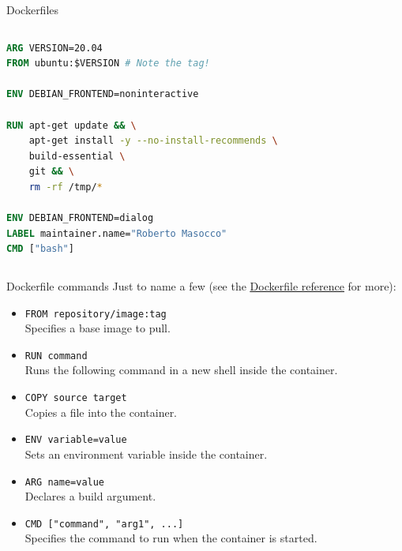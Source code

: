 \begin{frame}[fragile]{Dockerfiles}
\begin{columns}
\begin{lstlisting}[language=Dockerfile, caption=Minimal example of a Dockerfile running an Ubuntu image in a container]
ARG VERSION=20.04
FROM ubuntu:$VERSION # Note the tag!

ENV DEBIAN_FRONTEND=noninteractive

RUN apt-get update && \
    apt-get install -y --no-install-recommends \
    build-essential \
    git && \
    rm -rf /tmp/*

ENV DEBIAN_FRONTEND=dialog
LABEL maintainer.name="Roberto Masocco"
CMD ["bash"]
\end{lstlisting}
\end{columns}
\end{frame}
\begin{frame}{Dockerfile commands}
Just to name a few (see the \href{https://docs.docker.com/engine/reference/builder/}{\color{blue}\underline{Dockerfile reference}} for more):
\begin{itemize}
  \item \texttt{FROM repository/image:tag}\\Specifies a base image to pull.
  \item \texttt{RUN command}\\Runs the following command in a new shell inside the container.
  \item \texttt{COPY source target}\\Copies a file into the container.
  \item \texttt{ENV variable=value}\\Sets an environment variable inside the container.
  \item \texttt{ARG name=value}\\Declares a build argument.
  \item \texttt{CMD ["command", "arg1", ...]}\\Specifies the command to run when the container is started.
\end{itemize}
\end{frame}

